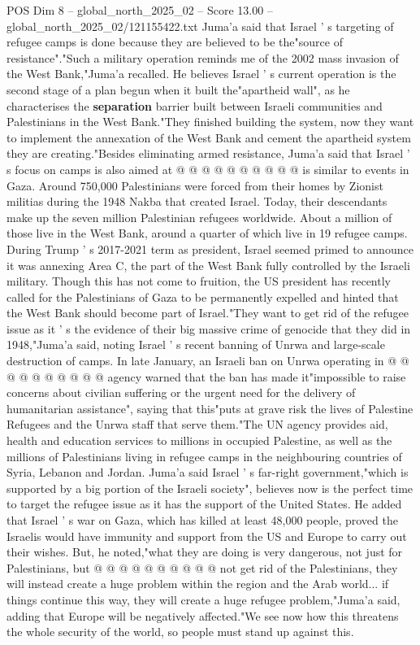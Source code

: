 \begin{textsample}{POS Dim 8 – global\_north\_2025\_02 – Score 13.00 – global\_north\_2025\_02/121155422.txt}
Juma'a said that Israel ' s targeting of refugee camps is done because they are believed to be the"source of resistance"."Such a military operation reminds me of the 2002 mass invasion of the West Bank,"Juma'a recalled.
He believes Israel ' s current operation is the second stage of a plan begun when it built the"apartheid wall", as he characterises the \textbf{separation} barrier built between Israeli communities and Palestinians in the West Bank."They finished building the system, now they want to implement the annexation of the West Bank and cement the apartheid system they are creating."Besides eliminating armed resistance, Juma'a said that Israel ' s focus on camps is also aimed at @ @ @ @ @ @ @ @ @ @ is similar to events in Gaza.
Around 750,000 Palestinians were forced from their homes by Zionist militias during the 1948 Nakba that created Israel.
Today, their descendants make up the seven million Palestinian refugees worldwide.
About a million of those live in the West Bank, around a quarter of which live in 19 refugee camps.
During Trump ' s 2017-2021 term as president, Israel seemed primed to announce it was annexing Area C, the part of the West Bank fully controlled by the Israeli military.
Though this has not come to fruition, the US president has recently called for the Palestinians of Gaza to be permanently expelled and hinted that the West Bank should become part of Israel."They want to get rid of the refugee issue as it ' s the evidence of their big massive crime of genocide that they did in 1948,"Juma'a said, noting Israel ' s recent banning of Unrwa and large-scale destruction of camps.
In late January, an Israeli ban on Unrwa operating in @ @ @ @ @ @ @ @ @ @ agency warned that the ban has made it"impossible to raise concerns about civilian suffering or the urgent need for the delivery of humanitarian assistance", saying that this"puts at grave risk the lives of Palestine Refugees and the Unrwa staff that serve them."The UN agency provides aid, health and education services to millions in occupied Palestine, as well as the millions of Palestinians living in refugee camps in the neighbouring countries of Syria, Lebanon and Jordan.
Juma'a said Israel ' s far-right government,"which is supported by a big portion of the Israeli society", believes now is the perfect time to target the refugee issue as it has the support of the United States.
He added that Israel ' s war on Gaza, which has killed at least 48,000 people, proved the Israelis would have immunity and support from the US and Europe to carry out their wishes.
But, he noted,"what they are doing is very dangerous, not just for Palestinians, but @ @ @ @ @ @ @ @ @ @ not get rid of the Palestinians, they will instead create a huge problem within the region and the Arab world... if things continue this way, they will create a huge refugee problem,"Juma'a said, adding that Europe will be negatively affected."We see now how this threatens the whole security of the world, so people must stand up against this.

\end{textsample}
